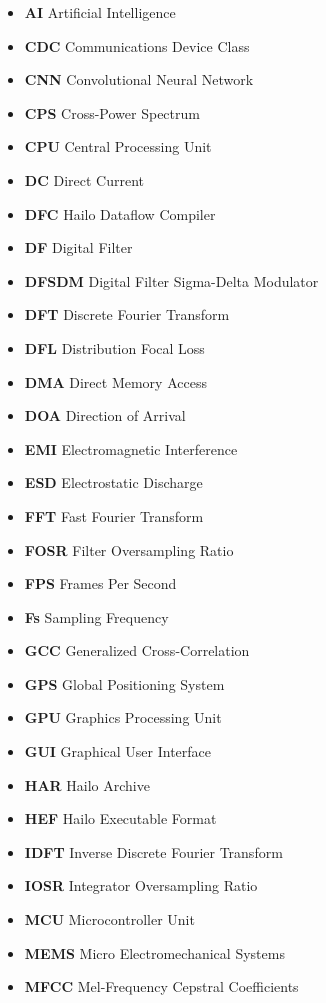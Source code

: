 \begin{itemize}
    \item \textbf{AI} Artificial Intelligence
    \item \textbf{CDC} Communications Device Class
    \item \textbf{CNN} Convolutional Neural Network
    \item \textbf{CPS} Cross-Power Spectrum
    \item \textbf{CPU} Central Processing Unit
    \item \textbf{DC} Direct Current
    \item \textbf{DFC} Hailo Dataflow Compiler
    \item \textbf{DF} Digital Filter
    \item \textbf{DFSDM} Digital Filter Sigma-Delta Modulator
    \item \textbf{DFT} Discrete Fourier Transform
    \item \textbf{DFL} Distribution Focal Loss
    \item \textbf{DMA} Direct Memory Access
    \item \textbf{DOA} Direction of Arrival
    \item \textbf{EMI} Electromagnetic Interference
    \item \textbf{ESD} Electrostatic Discharge
    \item \textbf{FFT} Fast Fourier Transform
    \item \textbf{FOSR} Filter Oversampling Ratio
    \item \textbf{FPS} Frames Per Second
    \item \textbf{Fs} Sampling Frequency
    \item \textbf{GCC} Generalized Cross-Correlation
    \item \textbf{GPS} Global Positioning System
    \item \textbf{GPU} Graphics Processing Unit
    \item \textbf{GUI} Graphical User Interface
    \item \textbf{HAR} Hailo Archive
    \item \textbf{HEF} Hailo Executable Format
    \item \textbf{IDFT} Inverse Discrete Fourier Transform
    \item \textbf{IOSR} Integrator Oversampling Ratio
    \item \textbf{MCU} Microcontroller Unit
    \item \textbf{MEMS} Micro Electromechanical Systems
    \item \textbf{MFCC} Mel-Frequency Cepstral Coefficients

\end{itemize}
